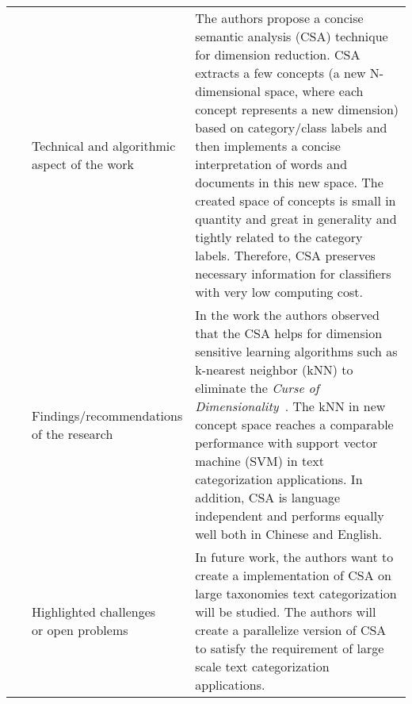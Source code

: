 \begin{landscape}
\begin{longtable}{lp{}p{}}
	\multirow{3}[0]{*}{~\citep{Li2011}} & 
    \specialcell{Technical and algorithmic \\ aspect of the work} &
	The authors propose a concise semantic analysis (CSA) technique for dimension reduction. CSA extracts a few concepts (a new N-dimensional space, where each concept represents a new dimension) based on category/class labels and then implements a concise interpretation of words and documents in this new space. The created space of concepts is small in quantity and great in generality and tightly related to the category labels. Therefore, CSA preserves necessary information for classifiers with very low computing cost.        
    \\ & 
    \specialcell{Findings/recommendations \\ of the research} & 
	In the work the authors observed that the CSA helps for dimension sensitive learning algorithms such as k-nearest neighbor (kNN) to eliminate the \textit{Curse of Dimensionality}~\citep{}. The kNN in new concept space reaches a comparable performance with support vector machine (SVM) in text categorization applications. In addition, CSA is language independent and performs equally well both in Chinese and English.
    \\ & 
    \specialcell{Highlighted challenges \\ or open problems} & 
    In future work, the authors want to create a implementation of CSA on large taxonomies text categorization will be studied. The authors will create a parallelize version of CSA to satisfy the requirement of large scale text categorization applications.
	\\
	

\end{longtable}
\end{landscape}
